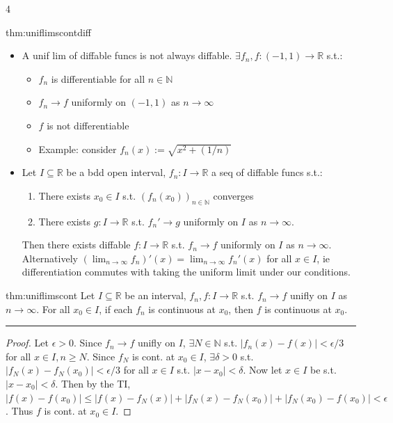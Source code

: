 \documentclass[landscape, 8pt]{extarticle}
\begin{document}
\begin{multicols*}{4}
		
		\begin{thm-s}{thm:uniflimscontdiff}{ }
		\begin{itemize}
			\item A unif lim of diffable funcs is not always diffable. $\exists f_n, f : (-1, 1) \to \mathbb{R}$ s.t.:
			\begin{itemize}
				\item $f_n$ is differentiable for all $n\in \mathbb{N}$
				\item $f_n \to f$ uniformly on $(-1, 1)$ as $n \to \infty$
				\item $f$ is not differentiable
				\item Example: consider $f_n(x) := \sqrt{x^2 + (1/n)}$
			\end{itemize}
			\item Let $I \subseteq \mathbb{R}$ be a bdd open interval, $f_n : I \to \mathbb{R}$ a seq of diffable funcs s.t.:
			\begin{enumerate}[label=(\arabic*)]
				\item There exists $x_0\in I$ s.t. $(f_n(x_0))_{n\in \mathbb{N}}$ converges
				\item There exists $g: I \to \mathbb{R}$ s.t. $f_n' \to g$ uniformly on $I$ as $n \to \infty$.
			\end{enumerate}
			Then there exists diffable $f: I \to \mathbb{R}$ s.t. $f_n \to f$ uniformly on $I$ as $n \to \infty$. Alternatively $(\lim_{n\to \infty}f_n)'(x) = \lim_{n\to \infty}f_n'(x)$ for all $x\in I$, ie differentiation commutes with taking the uniform limit under our conditions.
		\end{itemize}
		
		\end{thm-s}
		
		
		\begin{thm}{thm:uniflimscont}{ }
		Let $I \subseteq\mathbb{R}$ be an interval, $f_n, f : I \to \mathbb{R}$ s.t. $f_n \to f$ unifly on $I$ as $n \to \infty$. For all $x_0\in I$, if each $f_n$ is continuous at $x_0$, then $f$ is continuous at $x_0$.
		\vspace{1pt}
		\hrule	
		\vspace{-6pt}
		\begin{proof}
			Let $\epsilon > 0$. Since $f_n \to f$ unifly on $I$, $\exists N\in \mathbb{N}$ s.t. $\left|f_n(x) - f(x)\right| <\epsilon/3$ for all $x\in I, n \ge N$. Since $f_N$ is cont. at $x_0\in I$, $\exists \delta >0$ s.t. $\left|f_N(x) - f_N(x_0)\right| <\epsilon/3$ for all $x\in I$ s.t. $\left|x-x_0\right| < \delta$. Now let $x\in I$ be s.t. $\left|x - x_0\right| < \delta$. Then by the TI, $\left|f(x) - f(x_0)\right| \le \left|f(x) - f_N(x)\right| + \left|f_N(x) - f_N(x_0)\right| + \left|f_N(x_0) -f(x_0)\right| <\epsilon$. Thus $f$ is cont. at $x_0\in I$.
		\end{proof}
		

\end{thm}
\end{multicols*}
\end{document}
